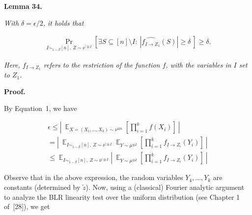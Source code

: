 \par\medskip\noindent\textbf{
\textbf{Lemma 34}\textbf{.}
}\par



\emph{With $\delta=\epsilon/2$, it holds that}\par


\[\begin{gathered}
\Pr_{I\sim_{1-\beta}[n],\ Z\sim\nu^{\prime\otimes I}}\left[\exists S\subseteq[n]\setminus I:\ \left|\widehat{f_{I\to Z_{1}}}(S)\right|\geqslant\delta\ \right]\geqslant\delta.
\end{gathered}\]


\emph{Here, $f_{I\to Z_{1}}$ refers to the restriction of the function $f$, with the variables in $I$ set to $Z_{1}$.}\par






\par\medskip\noindent\textbf{Proof.}\par




By Equation 1, we have\par


\[\begin{gathered}
\displaystyle\epsilon \displaystyle\leqslant\left|\ \mathop{\mathbb{E}}_{X=(X_{1},\dots,X_{k})\sim\nu^{\otimes n}}\left[\prod_{i=1}^{k}f(X_{i})\right]\ \right| \\
\displaystyle=\left|\ \mathop{\mathbb{E}}_{I\sim_{1-\beta}[n],\ Z\sim\nu^{\prime\otimes I}}\mathop{\mathbb{E}}_{Y\sim\mu^{\otimes\bar{I}}}\left[\prod_{i=1}^{k}f_{I\to Z_{i}}(Y_{i})\right]\ \right| \\
\displaystyle\leqslant\mathop{\mathbb{E}}_{I\sim_{1-\beta}[n],\ Z\sim\nu^{\prime\otimes I}}\left|\ \mathop{\mathbb{E}}_{Y\sim\mu^{\otimes\bar{I}}}\left[\prod_{i=1}^{k}f_{I\to Z_{i}}(Y_{i})\right]\ \right|
\end{gathered}\]


Observe that in the above expression, the random variables $Y_{4},\dots,Y_{k}$ are constants (determined by $\tilde{z}$).
Now, using a (classical) Fourier analytic argument to analyze the BLR linearity test over the uniform distribution (see Chapter 1 of [28]), we get\par


